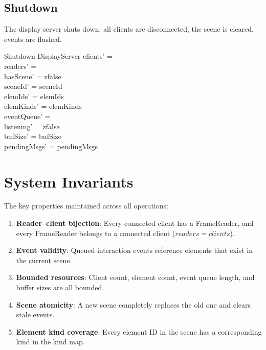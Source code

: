 \documentclass[a4paper,10pt,fleqn]{article}
\begin{document}
\subsection{Shutdown}

The display server shuts down: all clients are disconnected,
the scene is cleared, events are flushed.

\begin{schema}{Shutdown}
  \Delta DisplayServer
  \where
  clients' = \emptyset \\
  readers' = \emptyset \\
  hasScene' = zfalse \\
  sceneId' = sceneId \\
  elemIds' = elemIds \\
  elemKinds' = elemKinds \\
  eventQueue' = \emptyset \\
  listening' = zfalse \\
  bufSize' = bufSize \\
  pendingMsgs' = pendingMsgs
\end{schema}

\section{System Invariants}

The key properties maintained across all operations:

\begin{enumerate}
  \item \textbf{Reader--client bijection}: Every connected client
    has a FrameReader, and every FrameReader belongs to
    a connected client ($readers = clients$).

  \item \textbf{Event validity}: Queued interaction events reference
    elements that exist in the current scene.

  \item \textbf{Bounded resources}: Client count, element count,
    event queue length, and buffer sizes are all bounded.

  \item \textbf{Scene atomicity}: A new scene completely replaces
    the old one and clears stale events.

  \item \textbf{Element kind coverage}: Every element ID in the
    scene has a corresponding kind in the kind map.
\end{enumerate}
\end{document}
